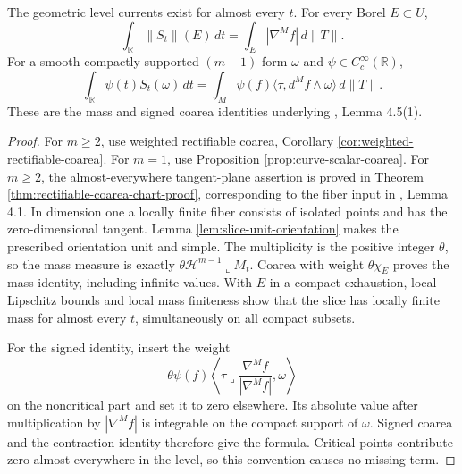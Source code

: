 \begin{proposition}\label{prop:geometric-slice-integration}
The geometric level currents exist for almost every $t$. For every Borel $E\subset U$,
\[
 \int_{\mathbb R}\|S_t\|(E)\,dt
 =\int_E|\nabla^Mf|\,d\|T\|.
\]
For a smooth compactly supported $(m-1)$-form $\omega$ and $\psi\in C_c^\infty(\mathbb R)$,
\[
 \int_{\mathbb R}\psi(t)S_t(\omega)\,dt
 =\int_M\psi(f)\langle\tau,d^Mf\wedge\omega\rangle\,d\|T\|.
\]
These are the mass and signed coarea identities underlying \cite{Sim18}, Lemma 4.5(1).
\end{proposition}
\begin{proof}
For $m\geq2$, use weighted rectifiable coarea, Corollary \ref{cor:weighted-rectifiable-coarea}. For $m=1$, use Proposition \ref{prop:curve-scalar-coarea}. For $m\geq2$, the almost-everywhere tangent-plane assertion is proved in Theorem \ref{thm:rectifiable-coarea-chart-proof}, corresponding to the fiber input in \cite{Sim18}, Lemma 4.1. In dimension one a locally finite fiber consists of isolated points and has the zero-dimensional tangent. Lemma \ref{lem:slice-unit-orientation} makes the prescribed orientation unit and simple. The multiplicity is the positive integer $\theta$, so the mass measure is exactly $\theta\mathcal H^{m-1}\llcorner M_t$. Coarea with weight $\theta\chi_E$ proves the mass identity, including infinite values. With $E$ in a compact exhaustion, local Lipschitz bounds and local mass finiteness show that the slice has locally finite mass for almost every $t$, simultaneously on all compact subsets.

For the signed identity, insert the weight
\[
 \theta\psi(f)\left\langle\tau\mathbin{\lrcorner}
       \frac{\nabla^Mf}{|\nabla^Mf|},\omega\right\rangle
\]
on the noncritical part and set it to zero elsewhere. Its absolute value after multiplication by $|\nabla^Mf|$ is integrable on the compact support of $\omega$. Signed coarea and the contraction identity therefore give the formula. Critical points contribute zero almost everywhere in the level, so this convention causes no missing term.
\end{proof}

